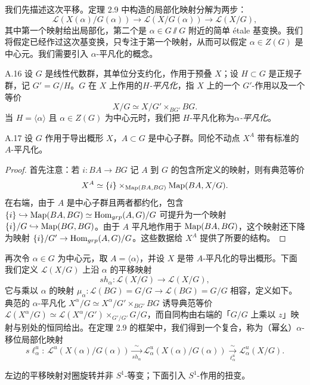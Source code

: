 我们先描述这次平移。定理 2.9 中构造的局部化映射分解为两步：
\[
\mathcal L(X(\alpha)/G(\alpha))\to\mathcal L(X/G(\alpha))\to\mathcal L(X/G),
\]
其中第一个映射给出局部化，第二个是 $\alpha\in G\sslash G$ 附近的简单 étale 基变换。我们将假定已经作过这次基变换，只专注于第一个映射，从而可以假定 $\alpha\in Z(G)$ 是中心元。我们需要引入 $\alpha$-平凡化的概念。


\begin{defn}{A.16}\label{defn:a5-04-10}
设 $G$ 是线性代数群，其单位分支约化，作用于预叠 $X$；设 $H\subset G$ 是正规子群，记 $G'=G/H$。$G$ 在 $X$ 上作用的\emph{$H$-平凡化}，指 $X$ 上的一个 $G'$-作用以及一个等价
\[
X/G\simeq X/G'\times_{BG'}BG.
\]
当 $H=\langle\alpha\rangle$ 且 $\alpha\in Z(G)$ 为中心元时，我们把 $H$-平凡化称为\emph{$\alpha$-平凡化}。
\end{defn}

\begin{prop}{A.17}\label{prop:a5-04-11}
设 $G$ 作用于导出概形 $X$，$A\subset G$ 是中心子群。同伦不动点 $X^A$ 带有标准的 $A$-平凡化。
\end{prop}

\begin{proof}
首先注意：若 $i:BA\to BG$ 记 $A$ 到 $G$ 的包含所定义的映射，则有典范等价
\[
X^A\simeq\{i\}\times_{\operatorname{Map}(BA,BG)}\operatorname{Map}(BA,X/G).
\]
在右端，由于 $A$ 是中心子群且两者都约化，包含 $\{i\}\hookrightarrow\operatorname{Map}(BA,BG)\simeq\operatorname{Hom}_{grp}(A,G)/G$ 可提升为一个映射 $\{i\}/G\hookrightarrow\operatorname{Map}(BG,BG)$。由于 $A$ 平凡地作用于 $\operatorname{Map}(BA,BG)$，这个映射还下降为映射 $\{i\}/G'\to\operatorname{Hom}_{grp}(A,G)/G$。这些数据给 $X^A$ 提供了所要的结构。
\end{proof}

再次令 $\alpha\in G$ 为中心元，取 $A=\langle\alpha\rangle$，并设 $X$ 是带 $A$-平凡化的导出概形。下面我们定义 $\mathcal L(X/G)$ 上沿 $\alpha$ 的平移映射
\[
sh_\alpha:\mathcal L(X/G)\to\mathcal L(X/G),
\]
它与乘以 $\alpha$ 的映射 $\mu_\alpha:\mathcal L(BG)=G/G\to\mathcal L(BG)=G/G$ 相容，定义如下。典范的 $\alpha$-平凡化 $X^\alpha/G\simeq X^\alpha/G'\times_{BG'}BG$ 诱导典范等价 $\mathcal L(X^\alpha/G)\simeq\mathcal L(X^\alpha/G')\times_{G'/G'}G/G$，而自同构由右端的「$G/G$ 上乘以 $z$」映射与别处的恒同给出。在定理 2.9 的框架中，我们得到一个复合，称为（幂幺）$\alpha$-移位局部化映射
\[
s\ell^u_\alpha:\ \mathcal L^u(X(\alpha)/G(\alpha))
\xrightarrow[sh_\alpha]{\sim}\mathcal L^u_\alpha(X(\alpha)/G(\alpha))
\xrightarrow[\ell^u_\alpha]{\sim}\mathcal L^u_\alpha(X/G).
\]

左边的平移映射对圈旋转并非 $S^1$-等变；下面引入 $S^1$-作用的扭变。

